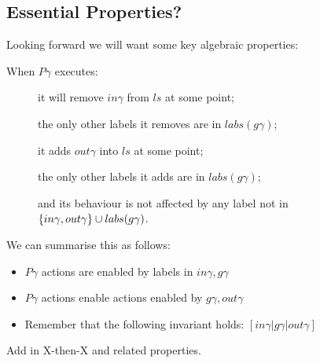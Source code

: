 \newpage
\subsection{Essential Properties?}


Looking forward we will want some key algebraic properties:


When $P\gamma$ executes:
\begin{description}
  \item[]
    it will remove $in\gamma$ from $ls$ at some point;
  \item[]
    the only other labels it removes are in $labs(g\gamma)$;
  \item[]
    it adds $out\gamma$ into $ls$ at some point;
  \item[]
    the only other labels it adds are in $labs(g\gamma)$;
  \item[]
    and its behaviour is not affected by any label not
    in
    \\$\{in\gamma,out\gamma\} \cup labs(g\gamma)$.
\end{description}
We can summarise this as follows:
\begin{itemize}
  \item $P\gamma$ actions are enabled by labels in $in\gamma,g\gamma$
  \item $P\gamma$ actions enable actions enabled by $g\gamma,out\gamma$
  \item Remember that the following invariant holds: $[in\gamma|g\gamma|out\gamma]$
\end{itemize}





Add in X-then-X and related properties.

